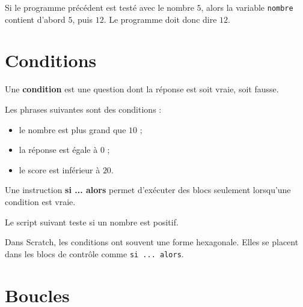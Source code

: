 \documentclass[a4paper,10pt]{report}
\begin{document}
\begin{exemple}
Si le programme précédent est testé avec le nombre $5$, alors la variable \texttt{nombre} contient d'abord $5$, puis $12$. Le programme doit donc dire $12$.
\end{exemple}

\section{Conditions}

\begin{defn}
Une \textbf{condition} est une question dont la réponse est soit vraie, soit fausse.
\end{defn}

\begin{exemple}
Les phrases suivantes sont des conditions :
\begin{itemize}
\item le nombre est plus grand que $10$ ;
\item la réponse est égale à $0$ ;
\item le score est inférieur à $20$.
\end{itemize}
\end{exemple}

\begin{defn}
Une instruction \textbf{si ... alors} permet d'exécuter des blocs seulement lorsqu'une condition est vraie.
\end{defn}

\begin{exemple}
Le script suivant teste si un nombre est positif.

\begin{center}
\begin{scratch}
{
}
\end{scratch}
\end{center}
\end{exemple}

\begin{rem}
Dans Scratch, les conditions ont souvent une forme hexagonale. Elles se placent dans les blocs de contrôle comme \texttt{si ... alors}.
\end{rem}

\section{Boucles}
\end{document}
